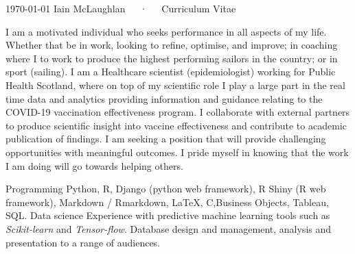 \documentclass[11pt, a4paper]{awesome-cv}
\begin{document}
\makecvheader
\makecvfooter
  {\today}
  {Iain McLaughlan~~~·~~~Curriculum Vitae}
  {\thepage}

\begin{cvparagraph}
I am a motivated individual who seeks performance in all aspects of my life. 
Whether that be in work, looking to refine, optimise, and improve; in coaching 
where I to work to produce the highest performing sailors in the country; or in 
sport (sailing).\newline
I am a Healthcare scientist (epidemiologist) working for Public Health Scotland, 
where on top of my scientific role I play a large part in the real time data and 
analytics providing information and guidance relating to the COVID-19 
vaccination effectiveness program. I collaborate with external partners to 
produce scientific insight into vaccine effectiveness and contribute to academic 
publication of findings.\newline
I am seeking a position that will provide challenging opportunities with 
meaningful outcomes. I pride myself in knowing that the work I am doing will go 
towards helping others.  
\end{cvparagraph}


\begin{cvskills}
  \cvskill
    {Programming} %
    {Python, R, Django (python web framework), R Shiny (R web framework), Markdown / Rmarkdown, LaTeX, C,\newline Business Objects, Tableau, SQL.} %
  \cvskill
    {Data science}
    {Experience with predictive machine learning tools such as \textit{Scikit-learn} and \textit{Tensor-flow}. Database design and management, analysis and presentation to a range of audiences.}

\end{cvskills}


\end{document}
